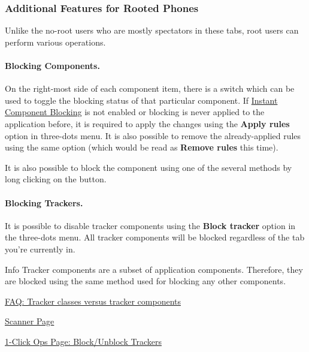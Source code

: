 \subsubsection{Additional Features for Rooted Phones} %
Unlike the no-root users who are mostly spectators in these tabs, root users can perform various operations.

\paragraph{Blocking Components.} %
On the right-most side of each component item, there is a switch which can be used to toggle the blocking status of that
particular component. If \hyperref[subsubsec:instant-component-blocking]{Instant Component Blocking} is not enabled or
blocking is never applied to the application before, it is required to apply the changes using the \textbf{Apply rules}
option in three-dots menu. It is also possible to remove the already-applied rules using the same option (which would be
read as \textbf{Remove rules} this time).

It is also possible to block the component using one of the several methods by long clicking on the button.


\paragraph{Blocking Trackers.}\label{par:appdetails:blocking-trackers} %
It is possible to disable tracker components using the \textbf{Block tracker} option in the three-dots menu. All tracker
components will be blocked regardless of the tab you're currently in.

\begin{tip}{Info}
    Tracker components are a subset of application components. Therefore, they are blocked using the same method used
    for blocking any other components.
\end{tip}

\begin{amseealso}
    \item \hyperref[subsec:tracker-classes-versus-tracker-components]{FAQ: Tracker classes versus tracker components}
    \item \hyperref[sec:scanner-page]{Scanner Page}
    \item \hyperref[subsec:block-unblock-trackers]{1-Click Ops Page: Block/Unblock Trackers}
\end{amseealso}


